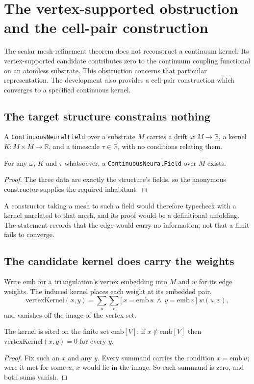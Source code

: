\section{The vertex-supported obstruction and the cell-pair construction}\label{sec:no-go}
The scalar mesh-refinement theorem does not reconstruct a continuum kernel.
Its vertex-supported candidate contributes zero to the continuum coupling
functional on an atomless substrate. This obstruction concerns that particular
representation. The development also provides a cell-pair construction which
converges to a specified continuous kernel.

\subsection{The target structure constrains nothing}
A \texttt{ContinuousNeuralField} over a substrate $M$ carries a drift
$\omega:M\to\mathbb{R}$, a kernel $K:M\times M\to\mathbb{R}$, and a timescale
$\tau\in\mathbb{R}$, with no conditions relating them.

\begin{claim}
For any $\omega$, $K$ and $\tau$ whatsoever, a \texttt{ContinuousNeuralField}
over $M$ exists.
\end{claim}
\begin{proof}
The three data are exactly the structure's fields, so the anonymous constructor
supplies the required inhabitant.
\end{proof}
\scope A constructor taking a mesh to such a field would therefore typecheck
with a kernel unrelated to that mesh, and its proof would be a definitional
unfolding. The statement records that the edge would carry no information, not
that a limit fails to converge.

\subsection{The candidate kernel does carry the weights}
Write $\mathrm{emb}$ for a triangulation's vertex embedding into $M$ and $w$ for
its edge weights. The induced kernel places each weight at its embedded pair,
\[
  \mathrm{vertexKernel}(x,y)=\sum_{u}\sum_{v}
    \bigl[\,x=\mathrm{emb}\,u \ \wedge\ y=\mathrm{emb}\,v\,\bigr]\;w(u,v),
\]
and vanishes off the image of the vertex set.

\begin{claim}
The kernel is sited on the finite set $\mathrm{emb}[V]$: if $x\notin
\mathrm{emb}[V]$ then $\mathrm{vertexKernel}(x,y)=0$ for every $y$.
\end{claim}
\begin{proof}
Fix such an $x$ and any $y$. Every summand carries the condition
$x=\mathrm{emb}\,u$; were it met for some $u$, $x$ would lie in the image. So
each summand is zero, and both sums vanish.
\end{proof}

